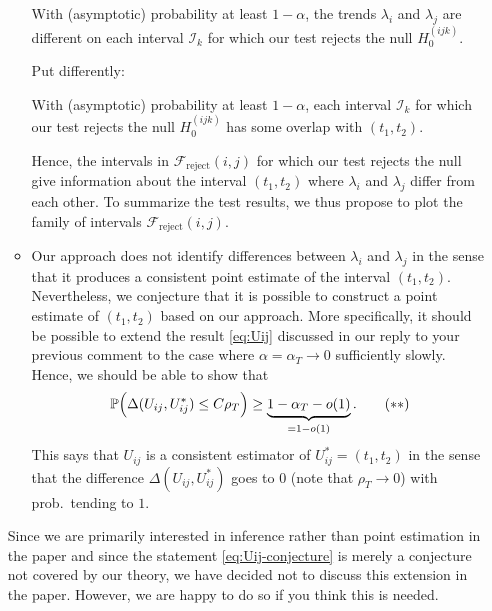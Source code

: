 \documentclass[a4paper,12pt]{article}
\begin{document}
\begin{enumerate}[label=(\arabic*),leftmargin=0.7cm]
\begin{itemize}[leftmargin=0.4cm]
\begin{center}
\begin{minipage}{0.8\textwidth}
With (asymptotic) probability at least $1-\alpha$, the trends $\lambda_i$ and $\lambda_j$ are different on each interval $\mathcal{I}_k$ for which our test rejects the null $H_0^{(ijk)}$.
\end{minipage}
\end{center} 
\vspace{0.1cm}

Put differently:
\vspace{0.1cm}

\begin{center}
\begin{minipage}{0.8\textwidth}
With (asymptotic) probability at least $1-\alpha$, each interval $\mathcal{I}_k$ for which our test rejects the null $H_0^{(ijk)}$ has some overlap with $(t_1,t_2)$.
\end{minipage}
\end{center}
\vspace{0.1cm}

Hence, the intervals in $\mathcal{F}_{\text{reject}}(i,j)$ for which our test rejects the null give information about the interval $(t_1,t_2)$ where $\lambda_i$ and $\lambda_j$ differ from each other. To summarize the test results, we thus propose to plot the family of intervals $\mathcal{F}_{\text{reject}}(i,j)$. 

\item Our approach does not identify differences between $\lambda_i$ and $\lambda_j$ in the sense that it produces a consistent point estimate of the interval $(t_1,t_2)$. Nevertheless, we conjecture that it is possible to construct a point estimate of $(t_1,t_2)$ based on our approach. More specifically, it should be possible to extend the result \eqref{eq:Uij} discussed in our reply to your previous comment to the case where $\alpha = \alpha_T \to 0$ sufficiently slowly. Hence, we should be able to show that 
\begin{equation}\label{eq:Uij-conjecture}
\mathbb{P} \Big( \Delta(U_{ij}, U_{ij}^*) \le C \rho_T \Big) \ge \underbrace{1-\alpha_T - o(1)}_{= 1 - o(1)}. \tag{$**$}
\end{equation}
This says that $U_{ij}$ is a consistent estimator of $U_{ij}^* = (t_1,t_2)$ in the sense that the difference $\Delta(U_{ij}, U_{ij}^*)$ goes to $0$ (note that $\rho_T \to 0$) with prob.\ tending to $1$. 

\end{itemize}
Since we are primarily interested in inference rather than point estimation in the paper and since the statement \eqref{eq:Uij-conjecture} is merely a conjecture not covered by our theory, we have decided not to discuss this extension in the paper. However, we are happy to do so if you think this is needed. 
 


\end{enumerate}
\end{document}
